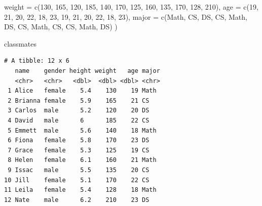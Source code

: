 \documentclass[
  letterpaper,
  DIV=11,
  numbers=noendperiod]{scrreprt}
\newenvironment{Shaded}{\begin{snugshade}}{\end{snugshade}}
\newcommand{\AttributeTok}[1]{\textcolor[rgb]{0.40,0.45,0.13}{#1}}
\newcommand{\DecValTok}[1]{\textcolor[rgb]{0.68,0.00,0.00}{#1}}
\newcommand{\FunctionTok}[1]{\textcolor[rgb]{0.28,0.35,0.67}{#1}}
\newcommand{\NormalTok}[1]{\textcolor[rgb]{0.00,0.23,0.31}{#1}}
\newcommand{\StringTok}[1]{\textcolor[rgb]{0.13,0.47,0.30}{#1}}
\begin{document}
\begin{Shaded}
\begin{Highlighting}[]
  \AttributeTok{weight =} \FunctionTok{c}\NormalTok{(}\DecValTok{130}\NormalTok{, }\DecValTok{165}\NormalTok{, }\DecValTok{120}\NormalTok{, }\DecValTok{185}\NormalTok{, }\DecValTok{140}\NormalTok{, }\DecValTok{170}\NormalTok{, }\DecValTok{125}\NormalTok{, }\DecValTok{160}\NormalTok{, }\DecValTok{135}\NormalTok{, }\DecValTok{170}\NormalTok{, }\DecValTok{128}\NormalTok{, }\DecValTok{210}\NormalTok{),}
  \AttributeTok{age =} \FunctionTok{c}\NormalTok{(}\DecValTok{19}\NormalTok{, }\DecValTok{21}\NormalTok{, }\DecValTok{20}\NormalTok{, }\DecValTok{22}\NormalTok{, }\DecValTok{18}\NormalTok{, }\DecValTok{23}\NormalTok{, }\DecValTok{19}\NormalTok{, }\DecValTok{21}\NormalTok{, }\DecValTok{20}\NormalTok{, }\DecValTok{22}\NormalTok{, }\DecValTok{18}\NormalTok{, }\DecValTok{23}\NormalTok{),}
  \AttributeTok{major =} \FunctionTok{c}\NormalTok{(}\StringTok{\textquotesingle{}Math\textquotesingle{}}\NormalTok{, }\StringTok{\textquotesingle{}CS\textquotesingle{}}\NormalTok{, }\StringTok{\textquotesingle{}DS\textquotesingle{}}\NormalTok{, }\StringTok{\textquotesingle{}CS\textquotesingle{}}\NormalTok{, }\StringTok{\textquotesingle{}Math\textquotesingle{}}\NormalTok{, }\StringTok{\textquotesingle{}DS\textquotesingle{}}\NormalTok{, }\StringTok{\textquotesingle{}CS\textquotesingle{}}\NormalTok{, }\StringTok{\textquotesingle{}Math\textquotesingle{}}\NormalTok{, }\StringTok{\textquotesingle{}CS\textquotesingle{}}\NormalTok{, }\StringTok{\textquotesingle{}CS\textquotesingle{}}\NormalTok{, }
            \StringTok{\textquotesingle{}Math\textquotesingle{}}\NormalTok{, }\StringTok{\textquotesingle{}DS\textquotesingle{}}\NormalTok{)}
\NormalTok{)}

\NormalTok{classmates}
\end{Highlighting}
\end{Shaded}

\begin{verbatim}
# A tibble: 12 x 6
   name    gender height weight   age major
   <chr>   <chr>   <dbl>  <dbl> <dbl> <chr>
 1 Alice   female    5.4    130    19 Math 
 2 Brianna female    5.9    165    21 CS   
 3 Carlos  male      5.2    120    20 DS   
 4 David   male      6      185    22 CS   
 5 Emmett  male      5.6    140    18 Math 
 6 Fiona   female    5.8    170    23 DS   
 7 Grace   female    5.3    125    19 CS   
 8 Helen   female    6.1    160    21 Math 
 9 Issac   male      5.5    135    20 CS   
10 Jill    female    5.1    170    22 CS   
11 Leila   female    5.4    128    18 Math 
12 Nate    male      6.2    210    23 DS   
\end{verbatim}
\end{document}
